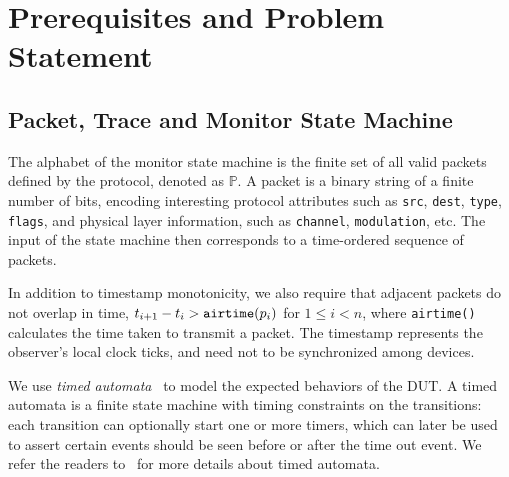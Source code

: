 \section{Prerequisites and Problem Statement}
\label{sec:background}

\subsection{Packet, Trace and Monitor State Machine}
\label{subsec:basic}

The alphabet of the monitor state machine is the finite set of all valid packets
defined by the protocol, denoted as $\mathbb{P}$.  A packet is a binary string
of a finite number of bits, encoding interesting protocol attributes such as
\texttt{src}, \texttt{dest}, \texttt{type}, \texttt{flags}, and physical layer
information, such as \texttt{channel}, \texttt{modulation}, etc. The input of
the state machine then corresponds to a time-ordered sequence of packets.

\begin{definition}
\end{definition}%

In addition to timestamp monotonicity, we also require that adjacent packets do
not overlap in time, $t_{i+1}-t_i > \text{\texttt{airtime}}(p_i)$ for $1 \le i <
n$, where \texttt{airtime()} calculates the time taken to transmit a packet.
The timestamp represents the observer's local clock ticks, and need not to be
synchronized among devices.

We use \textit{timed automata}~\cite{alur1994theory} to model the expected
behaviors of the DUT. A timed automata is a finite state machine with timing
constraints on the transitions: each transition can optionally start one or more
timers, which can later be used to assert certain events should be seen before
or after the time out event. We refer the readers to~\cite{alur1994theory} for
more details about timed automata.


